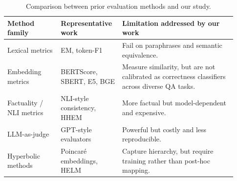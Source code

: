 \documentclass{article}
\begin{document}

\begin{table}[ht]
\centering
\caption{Comparison between prior evaluation methods and our study.}
\label{tab:related}
\small
\setlength{\tabcolsep}{4pt}
\renewcommand{\arraystretch}{1.08}
\begin{tabular}{@{}L{0.22\linewidth} L{0.24\linewidth} L{0.47\linewidth}@{}}
\toprule
\textbf{Method family} &
\textbf{Representative work} &
\textbf{Limitation addressed by our work} \\
\midrule
Lexical metrics &
EM, token-F1 &
Fail on paraphrases and semantic equivalence. \\

Embedding metrics &
BERTScore, SBERT, E5, BGE &
Measure similarity, but are not calibrated as correctness classifiers across diverse QA tasks. \\

Factuality / NLI metrics &
NLI-style consistency, HHEM &
More factual but model-dependent and expensive. \\

LLM-as-judge &
GPT-style evaluators &
Powerful but costly and less reproducible. \\

Hyperbolic methods &
Poincaré embeddings, HELM &
Capture hierarchy, but require training rather than post-hoc mapping. \\
\bottomrule
\end{tabular}
\end{table}
\end{document}
